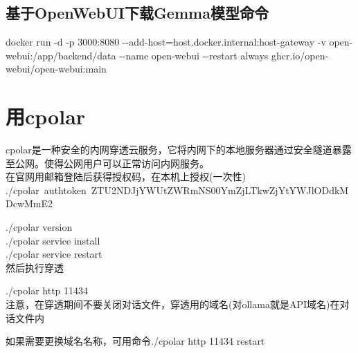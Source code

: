 \documentclass[10pt,a4paper]{article}
\begin{document}
\subsection{基于\rm{OpenWebUI}下载\rm{Gemma}模型命令}
\textrm{docker run -d -p 3000:8080 -\/-add-host=host.docker.internal:host-gateway -v open-webui:/app/backend/data -\/-name open-webui -\/-restart always ghcr.io/open-webui/open-webui:main}

\section{用\textrm{cpolar}}
\textrm{cpolar}是一种安全的内网穿透云服务，它将内网下的本地服务器通过安全隧道暴露至公网。使得公网用户可以正常访问内网服务。\\
在官网用邮箱登陆后获得授权码，在本机上授权(一次性)\\
\textrm{./cpolar~authtoken~ZTU2NDJjYWUtZWRmNS00YmZjLTkwZjYtYWJlODdkMDcwMmE2}

\textrm{./cpolar version}\\
\textrm{./cpolar service install}\\
\textrm{./cpolar service restart }\\
然后执行穿透

\textrm{./cpolar http 11434}\\
注意，在穿透期间不要关闭对话文件，穿透用的域名(对\textrm{ollama}就是\textrm{API}域名)在对话文件内

如果需要更换域名名称，可用命令\textrm{./cpolar http 11434 restart}


\end{document}
